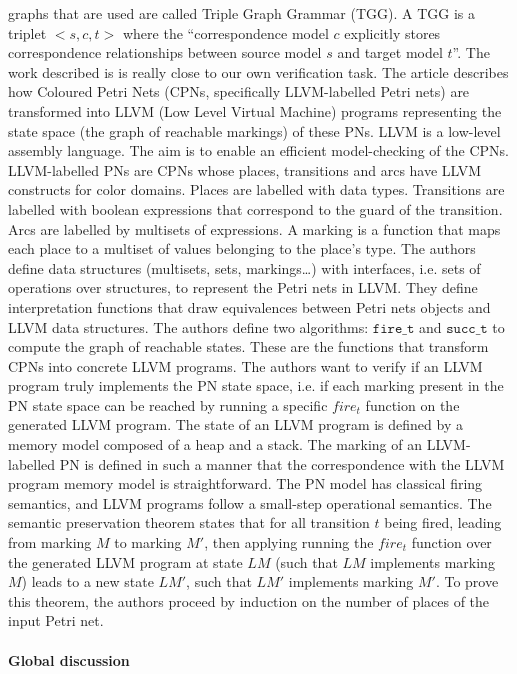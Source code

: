 \documentclass[pdflatex,sn-mathphys]{sn-jnl}%
\theoremstyle{thmstyleone}%
\theoremstyle{thmstyletwo}%
\theoremstyle{thmstylethree}%
\begin{document}
graphs that are used are called Triple Graph Grammar (TGG). A TGG is a
triplet ${<}s,c,t{>}$ where the ``correspondence model $c$ explicitly
stores correspondence relationships between source model $s$ and
target model $t$''. The work described is \cite{Fronc2011} is really
close to our own verification task. The article describes how Coloured
Petri Nets (CPNs, specifically LLVM-labelled Petri nets) are
transformed into LLVM (Low Level Virtual Machine) programs
representing the state space (the graph of reachable markings) of
these PNs. LLVM is a low-level assembly language. The aim is to enable
an efficient model-checking of the CPNs.  LLVM-labelled PNs are CPNs
whose places, transitions and arcs have LLVM constructs for color
domains. Places are labelled with data types.  Transitions are
labelled with boolean expressions that correspond to the guard of the
transition. Arcs are labelled by multisets of expressions. A marking
is a function that maps each place to a multiset of values belonging
to the place's type.  The authors define data structures (multisets,
sets, markings\dots) with interfaces, i.e. sets of operations over
structures, to represent the Petri nets in LLVM.  They define
interpretation functions that draw equivalences between Petri nets
objects and LLVM data structures.  The authors define two algorithms:
$\mathtt{fire\_t}$ and $\mathtt{succ\_t}$ to compute the graph of
reachable states.  These are the functions that transform CPNs into
concrete LLVM programs.  The authors want to verify if an LLVM program
truly implements the PN state space, i.e. if each marking present in
the PN state space can be reached by running a specific $fire_t$
function on the generated LLVM program. The state of an LLVM program
is defined by a memory model composed of a heap and a stack. The
marking of an LLVM-labelled PN is defined in such a manner that the
correspondence with the LLVM program memory model is
straightforward. The PN model has classical firing semantics, and LLVM
programs follow a small-step operational semantics. The semantic
preservation theorem states that for all transition $t$ being fired,
leading from marking $M$ to marking $M'$, then applying running the
$fire_t$ function over the generated LLVM program at state $LM$ (such
that $LM$ implements marking $M$) leads to a new state $LM'$, such
that $LM'$ implements marking $M'$. To prove this theorem, the authors
proceed by induction on the number of places of the input Petri net.


\paragraph{Global discussion}
\end{document}
